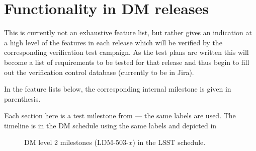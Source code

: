 \section{Functionality in DM releases}
\label{sect:features}

This is currently not an exhaustive feature list, but rather gives an indication at a high level of the features in each release which will be verified by the corresponding verification test campaign.
As the test plans are written this will become a list of requirements to be tested for that release and thus begin to fill out the verification control database (currently to be in Jira).

In the feature lists below, the corresponding internal milestone is given in parenthesis.

Each section here is a test milestone from  --- the same labels are used.
The timeline is in the DM schedule using the same labels and depicted in 

\begin{figure}[htbp]
        \begin{center}
                 
                 \caption{DM level 2 milestones (LDM-503-$x$) in the LSST schedule.}
                 \label{fig:schedule}
         \end{center}
 \end{figure}



